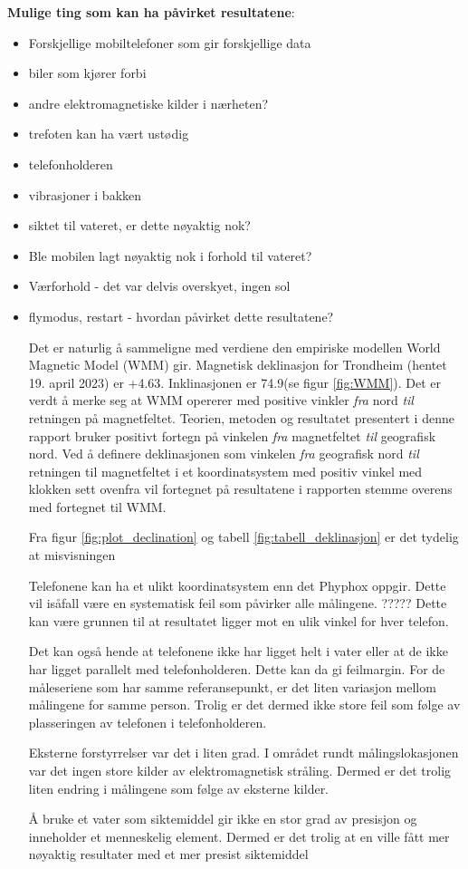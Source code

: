 \noindent\textbf{Mulige ting som kan ha påvirket resultatene}:
\begin{itemize}
    \item Forskjellige mobiltelefoner som gir forskjellige data 
    \item biler som kjører forbi
    \item andre elektromagnetiske kilder i nærheten? 
    \item trefoten kan ha vært ustødig
    \item telefonholderen
    \item vibrasjoner i bakken               
    \item siktet til vateret, er dette nøyaktig nok?
    \item Ble mobilen lagt nøyaktig nok i forhold til vateret?
    \item Værforhold - det var delvis overskyet, ingen sol
    \item flymodus, restart - hvordan påvirket dette resultatene?

Det er naturlig å sammeligne med verdiene den empiriske modellen World Magnetic Model (WMM) gir.
Magnetisk deklinasjon for Trondheim (hentet 19. april 2023) er +4.63\textdegree. Inklinasjonen er 74.9\textdegree (se figur \ref{fig:WMM}). 
\newline
Det er verdt å merke seg at WMM opererer med positive vinkler \textit{fra} nord \textit{til} retningen på magnetfeltet. 
Teorien, metoden og resultatet presentert i denne rapport bruker positivt fortegn på vinkelen \textit{fra} magnetfeltet \textit{til} geografisk nord.
Ved å definere deklinasjonen som vinkelen \textit{fra} geografisk nord \textit{til} retningen til magnetfeltet i et koordinatsystem med positiv vinkel med klokken sett ovenfra vil fortegnet på resultatene i rapporten stemme overens med fortegnet til WMM.  
\par
Fra figur \ref{fig:plot_declination} og tabell \ref{fig:tabell_deklinasjon} er det tydelig at misvisningen 
\par
Telefonene kan ha et ulikt koordinatsystem enn det Phyphox oppgir. 
Dette vil isåfall være en systematisk feil som påvirker alle målingene. 
????? Dette kan være grunnen til at resultatet ligger  mot en ulik vinkel for hver telefon. 

Det kan også hende at telefonene ikke har ligget helt i vater eller at de ikke har ligget parallelt med telefonholderen. Dette kan da gi feilmargin. For de måleseriene som har samme referansepunkt, er det liten variasjon mellom målingene for samme person. Trolig er det dermed ikke store feil som følge av plasseringen av telefonen i telefonholderen. 

Eksterne forstyrrelser var det i liten grad. I området rundt målingslokasjonen var det ingen store kilder av elektromagnetisk stråling. Dermed er det trolig liten endring i målingene som følge av eksterne kilder. 

Å bruke et vater som siktemiddel gir ikke en stor grad av presisjon og inneholder et menneskelig element. Dermed er det trolig at en ville fått mer nøyaktig resultater med et mer presist siktemiddel

\end{itemize}



 